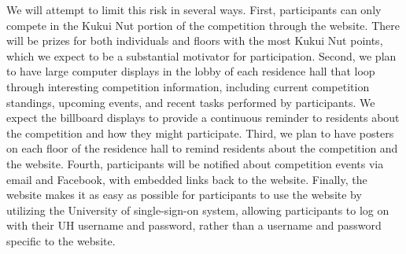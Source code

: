 We will attempt to limit this risk in several ways. First, participants can only compete in the Kukui Nut portion of the competition through the website. There will be prizes for both individuals and floors with the most Kukui Nut points, which we expect to be a substantial motivator for participation. Second, we plan to have large computer displays in the lobby of each residence hall that loop through interesting competition information, including current competition standings, upcoming events, and recent tasks performed by participants. We expect the billboard displays to provide a continuous reminder to residents about the competition and how they might participate. Third, we plan to have posters on each floor of the residence hall to remind residents about the competition and the website. Fourth, participants will be notified about competition events via email and Facebook, with embedded links back to the website. Finally, the website makes it as easy as possible for participants to use the website by utilizing the University of \Hawaii single-sign-on system, allowing participants to log on with their UH username and password, rather than a username and password specific to the website.